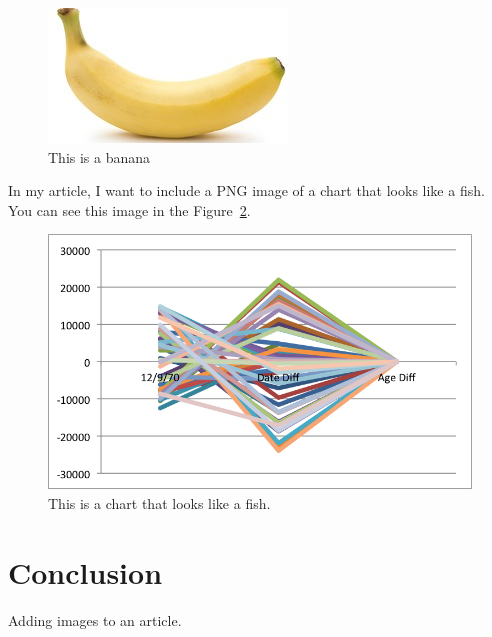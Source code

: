 \documentclass{proc}
\begin{document}
\begin{figure}[htbp]
	\begin{center}
	\includegraphics[scale=0.5]{Banana.jpg}
	\caption{This is a banana}
	\label{fig:banana}
	\end{center}
\end{figure}

In my article, I want to include a PNG image of a chart that looks like a fish. You can see this image in the Figure~\ref{fig:fish}.

\begin{figure}[htbp]
	\begin{center}
	\includegraphics[width=5 cm]{Fish.png}
	\caption{This is a chart that looks like a fish.}
	\label{fig:fish}
	\end{center}
\end{figure}


\section{Conclusion}
Adding images to an article.
\end{document}
